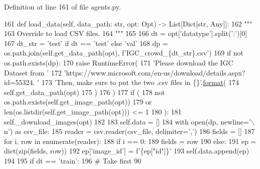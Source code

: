 Definition at line 161 of file agents.\+py.


\begin{DoxyCode}
161     \textcolor{keyword}{def }load\_data(self, data\_path: str, opt: Opt) -> List[Dict[str, Any]]:
162         \textcolor{stringliteral}{"""}
163 \textcolor{stringliteral}{        Override to load CSV files.}
164 \textcolor{stringliteral}{        """}
165 
166         dt = opt[\textcolor{stringliteral}{'datatype'}].split(\textcolor{stringliteral}{':'})[0]
167         dt\_str = \textcolor{stringliteral}{'test'} \textcolor{keywordflow}{if} dt == \textcolor{stringliteral}{'test'} \textcolor{keywordflow}{else} \textcolor{stringliteral}{'val'}
168         dp = os.path.join(self.get\_data\_path(opt), f\textcolor{stringliteral}{'IGC\_crowd\_\{dt\_str\}.csv'})
169         \textcolor{keywordflow}{if} \textcolor{keywordflow}{not} os.path.exists(dp):
170             \textcolor{keywordflow}{raise} RuntimeError(
171                 \textcolor{stringliteral}{'Please download the IGC Dataset from '}
172                 \textcolor{stringliteral}{'https://www.microsoft.com/en-us/download/details.aspx?id=55324. '}
173                 \textcolor{stringliteral}{'Then, make sure to put the two .csv files in \{\}'}.\hyperlink{namespaceparlai_1_1chat__service_1_1services_1_1messenger_1_1shared__utils_a32e2e2022b824fbaf80c747160b52a76}{format}(
174                     self.get\_data\_path(opt)
175                 )
176             )
177         \textcolor{keywordflow}{if} (
178             \textcolor{keywordflow}{not} os.path.exists(self.get\_image\_path(opt))
179             \textcolor{keywordflow}{or} len(os.listdir(self.get\_image\_path(opt))) <= 1
180         ):
181             self.\_download\_images(opt)
182 
183         self.data = []
184         with open(dp, newline=\textcolor{stringliteral}{'\(\backslash\)n'}) \textcolor{keyword}{as} csv\_file:
185             reader = csv.reader(csv\_file, delimiter=\textcolor{stringliteral}{','})
186             fields = []
187             \textcolor{keywordflow}{for} i, row \textcolor{keywordflow}{in} enumerate(reader):
188                 \textcolor{keywordflow}{if} i == 0:
189                     fields = row
190                 \textcolor{keywordflow}{else}:
191                     ep = dict(zip(fields, row))
192                     ep[\textcolor{stringliteral}{'image\_id'}] = f\textcolor{stringliteral}{'\{ep["id"]\}'}
193                     self.data.append(ep)
194 
195         \textcolor{keywordflow}{if} dt == \textcolor{stringliteral}{'train'}:
196             \textcolor{comment}{# Take first 90%
}
\end{DoxyCode}
